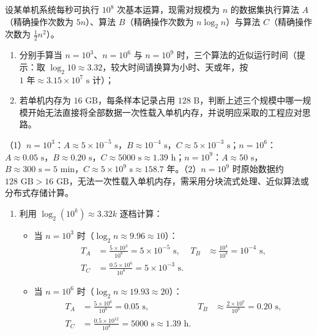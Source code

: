\begin{exercise}[title={数据规模跃迁与复杂度手算},level=standard,points=15,tags={时间复杂度,大数据规模}]
设某单机系统每秒可执行 $10^8$ 次基本运算，现需对规模为 $n$ 的数据集执行算法 $A$（精确操作次数为 $5n$）、算法 $B$（精确操作次数为 $n\log_2 n$）与算法 $C$（精确操作次数为 $\frac{1}{2}n^2$）。
\begin{enumerate}
  \item 分别手算当 $n = 10^3$、$n = 10^6$ 与 $n = 10^9$ 时，三个算法的近似运行时间（提示：取 $\log_2 10 \approx 3.32$，较大时间请换算为小时、天或年，按 $1\text{ 年}\approx 3.15\times 10^7\text{ s}$ 计）；
  \item 若单机内存为 $16\text{ GB}$，每条样本记录占用 $128\text{ B}$，判断上述三个规模中哪一规模开始无法直接将全部数据一次性载入单机内存，并说明应采取的工程应对思路。
\end{enumerate}
\begin{answer}
（1）$n=10^3$：$A\approx 5\times 10^{-5}\text{ s}$，$B\approx 10^{-4}\text{ s}$，$C\approx 5\times 10^{-3}\text{ s}$；$n=10^6$：$A\approx 0.05\text{ s}$，$B\approx 0.20\text{ s}$，$C\approx 5000\text{ s}\approx 1.39\text{ h}$；$n=10^9$：$A\approx 50\text{ s}$，$B\approx 300\text{ s}=5\text{ min}$，$C\approx 5\times 10^9\text{ s}\approx 158.7\text{ 年}$。（2）$n=10^9$ 时原始数据约 $128\text{ GB} > 16\text{ GB}$，无法一次性载入单机内存，需采用分块流式处理、近似算法或分布式存储计算。
\end{answer}
\begin{solution}
\begin{enumerate}
  \item 利用 $\log_2(10^k) \approx 3.32k$ 逐档计算：
  \begin{itemize}
    \item 当 $n = 10^3$ 时（$\log_2 n \approx 9.96 \approx 10$）：
    \[\begin{aligned}
      T_A &= \frac{5\times 10^3}{10^8} = 5\times 10^{-5}\text{ s}, &
      T_B &\approx \frac{10^4}{10^8} = 10^{-4}\text{ s}, \\
      T_C &= \frac{0.5\times 10^6}{10^8} = 5\times 10^{-3}\text{ s}.
    \end{aligned}\]
    \item 当 $n = 10^6$ 时（$\log_2 n \approx 19.93 \approx 20$）：
    \[\begin{aligned}
      T_A &= \frac{5\times 10^6}{10^8} = 0.05\text{ s}, &
      T_B &\approx \frac{2\times 10^7}{10^8} = 0.20\text{ s}, \\
      T_C &= \frac{0.5\times 10^{12}}{10^8} = 5000\text{ s} \approx 1.39\text{ h}.

\end{aligned}\]
\end{itemize}
\end{enumerate}
\end{solution}
\end{exercise}
